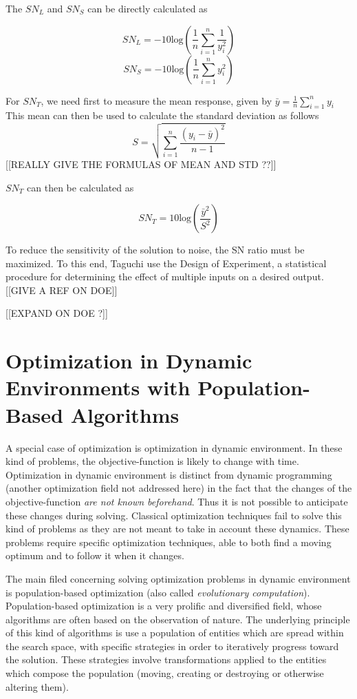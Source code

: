 The $SN_L$ and $SN_S$ can be directly calculated as

\[SN_L = -10\text{log}\left( \frac{1}{n} \sum_{i=1}^n \frac{1}{y_i^2} \right)\]
\[SN_S = -10\text{log}\left( \frac{1}{n} \sum_{i=1}^n y_i^2 \right)\]

For $SN_T$, we need first to measure the mean response, given by $\bar{y} = \frac{1}{n}\sum_{i=1}^n y_i$
This mean can then be used to calculate the standard deviation as follows 
\[S = \sqrt{\sum_{i=1}^n \frac{(y_i - \bar{y})^2}{n-1}}\]
[[REALLY GIVE THE FORMULAS OF MEAN AND STD ??]]

 $SN_T$ can then be calculated as
 
 \[ SN_T = 10\text{log}\left(\frac{\bar{y}^2}{S^2}\right) \]
 
To reduce the sensitivity of the solution to noise, the SN ratio must be maximized. To this end, Taguchi use the Design of Experiment, a statistical procedure for determining the effect of multiple inputs on a desired output. [[GIVE A REF ON DOE]]

[[EXPAND ON DOE  ?]]


\section{Optimization in Dynamic Environments with Population-Based Algorithms}
A special case of optimization is optimization in dynamic environment. In these kind of problems, the objective-function is likely to change with time. Optimization in dynamic environment is distinct from dynamic programming (another optimization field not addressed here) in the fact that the changes of the objective-function \emph{are not known beforehand}. Thus it is not possible to anticipate these changes during solving.
Classical optimization techniques fail to solve this kind of problems as they are not meant to take in account these dynamics. These problems require specific optimization techniques, able to both find a moving optimum and to follow it when it changes.

The main filed concerning solving optimization problems in dynamic environment is population-based optimization (also called \emph{evolutionary computation}). Population-based optimization is a very prolific and diversified field, whose algorithms are often based on the observation of nature. The underlying principle of this kind of algorithms is use a population of entities which are spread within the search space, with specific strategies in order to iteratively progress toward the solution. These strategies involve transformations applied to the entities which compose the population (moving, creating or destroying or otherwise altering them).

